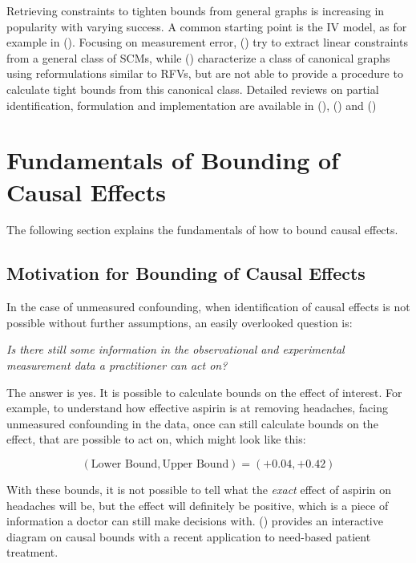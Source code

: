 \documentclass{article}
\begin{document}
Retrieving constraints to tighten bounds from general graphs is increasing in popularity with varying success. A common starting point is the IV model, as for example in (\cite{sachs2020symbolic}). Focusing on measurement error, (\cite{noam2020class}) try to extract linear constraints from a general class of SCMs, while (\cite{bareinboim2021nonparam}) characterize a class of canonical graphs using reformulations similar to RFVs, but are not able to provide a procedure to calculate tight bounds from this canonical class. Detailed reviews on partial identification, formulation and implementation are available in (\cite{richardson2014nonparametric}), (\cite{wu2019pc}) and (\cite{swanson2018partial})

\section{Fundamentals of Bounding of Causal
Effects}
\label{sec:bounding_fundamentals}

The following section explains the fundamentals of how to bound causal effects.

    \hypertarget{motivation-for-bounding-of-causal-effects}{%
\subsection{Motivation for Bounding of Causal
Effects}\label{motivation-for-bounding-of-causal-effects}}

In the case of unmeasured confounding, when identification of causal
effects is not possible without further assumptions, an easily
overlooked question is: 

\smallskip

\begin{center}
\emph{Is there still some information in the
observational and experimental measurement data a practitioner can act on?}
\end{center}

\smallskip


The answer is yes. It is possible to calculate bounds on the effect of
interest. For example, to understand how effective aspirin is at
removing headaches, facing unmeasured confounding in the data, once can
still calculate bounds on the effect, that are possible to act on, which might look like this:

\[(\text{Lower Bound},\text{Upper Bound}) = (+0.04,+0.42)\]

With these bounds, it is not possible to tell what the \textit{exact} effect of
aspirin on headaches will be, but the effect will definitely be
positive, which is a piece of information a doctor can still make
decisions with. (\cite{pearl2020}) provides an interactive diagram on causal bounds with a recent application to need-based patient treatment.
\end{document}
